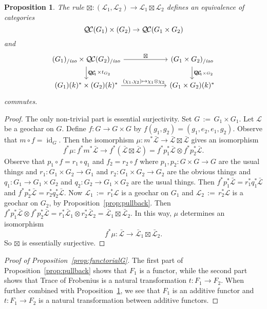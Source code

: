 \documentclass[11pt]{amsart}
\theoremstyle{plain}
\newtheorem{proposition}[theorem]{Proposition}
\theoremstyle{definition}
\theoremstyle{remark}
\newcommand{\Fq}{k}
\DeclareMathOperator{\id}{id}
\newcommand{\ceq}{{\, :=\, }}
\newcommand{\cs}[1]{{\mathcal{#1}}}
\newcommand{\gcs}[1]{{\mathcal{\bar #1}}}
\newcommand{\QC}{{\mathcal{Q\hskip-0.8pt C}}}
\newcommand{\QCiso}[1]{\QC(#1)_{/\textit{iso}}}
\newcommand{\trFrob}[1]{t_{#1}}
\begin{document}
\begin{proposition}\label{prop:product}
The rule $\boxtimes : (\cs{L}_1,\cs{L}_2)\to \cs{L}_1\boxtimes\cs{L}_2$ defines an equivalence of categories 
\[
\QC(G_1)\times(G_2) \to \QC(G_1\times G_2)
\]
and 
\[
\begin{tikzcd}[column sep=60]
\arrow{d}{\trFrob{G_1} \times \trFrob{G_2}} \QCiso{G_1}\times \QCiso{G_2} \arrow{r}{\boxtimes} & \arrow{d}{\trFrob{G_1\times G_2}} \QCiso{G_1\times G_2}\\
(G_1)(\Fq)^*\times (G_2)(\Fq)^* \arrow{r}{(\chi_1,\chi_2)\mapsto \chi_1\otimes \chi_2}  & (G_1\times G_2)(\Fq)^*
\end{tikzcd}
\]
commutes.
\end{proposition}

\begin{proof}
The only non-trivial part is essential surjectivity. Set $G \ceq G_1\times G_1$. Let $\cs{L}$ be a geochar on $G$. Define $f : G\to G\times G$ by $f(g_1,g_2) = (g_1,e_2,e_1,g_2)$. Observe that $m\circ f = \id_G$. 
Then the isomorphism $\mu : m^* \gcs{L} \to \gcs{L}\boxtimes \gcs{L}$ gives an isomorphism
\[
f^*\mu : f^* m^* \gcs{L} \to f^*(\gcs{L}\boxtimes \gcs{L}) = f^*p_1^*\gcs{L}\otimes f^* p_2^*\gcs{L}.
\]
Observe that $p_1\circ f = r_1 \circ q_1$ and $f_2 = r_2\circ f$ where $p_1 , p_2 : G\times G \to G$ are the usual things and $r_1 : G_1\times G_2 \to G_1$ and $r_2 : G_1\times G_2 \to G_2$ are the obvious things and $q_1 : G_1\to G_1\times G_2$ and  $q_2 : G_2\to G_1\times G_2$ are the usual things. Then $f^*p_1^*\gcs{L} = r_1^* q_1^* \gcs{L}$ and $f^*p_2^*\gcs{L} = r_2^* q_2^* \gcs{L}$. Now $\cs{L}_1 \ceq r_1^* \cs{L}$ is a geochar on $G_1$ and $\cs{L}_2 \ceq r_2^* \cs{L}$ is a geochar on $G_2$, by Proposition~\ref{prop:pullback}. Then
$ f^*p_1^*\gcs{L}\otimes f^* p_2^*\gcs{L} = r_1^*\gcs{L}_1\otimes r_2^* \gcs{L}_2 = \gcs{L}_1\boxtimes \gcs{L}_2$. In this way, $\mu$ determines an isomorphism
\[
f^*\mu : \gcs{L} \to  \gcs{L}_1\boxtimes \gcs{L}_2.
\]
So $\boxtimes$ is essentially surjective.
\end{proof}

\begin{proof}[Proof of Proposition~\ref{prop:functorialG}]
The first part of Proposition~\ref{prop:pullback} shows that $F_1$ is a functor, while the second part shows that Trace of Frobenius is a natural transformation $t: F_1 \to F_2$. When further combined with Proposition~\ref{prop:product}, we see that $F_1$ is an additive functor and $t: F_1 \to F_2$ is a natural transformation between additive functors.
\end{proof}
\end{document}

